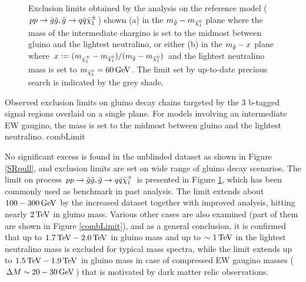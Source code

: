 \begin{figure}[h]
  \centering
    \caption{ Exclusion limits obtained by the analysis on the reference model ($pp \rightarrow \tilde{g}\tilde{g},  \tilde{g} \rightarrow q\bar{q} \tilde{\chi}_{1}^{\pm}$) shown 
  (a) in the $m_{\tilde{g}}-m_{\tilde{\chi}_{1}^{0}}$ plane where the mass of the intermediate chargino is set to the midmost between gluino and the lightest neutralino, or either 
  (b) in the $m_{\tilde{g}}-x$ plane where $x:= (m_{\tilde{\chi}_{1}^{\pm}}-m_{\tilde{\chi}_{1}^{0}})/(m_{\tilde{g}}-m_{\tilde{\chi}_{1}^{0}})$ and the lightest neutralino mass is set to $m_{\tilde{\chi}_{1}^{0}}=60\, \mathrm{GeV}$. 
  The limit set by up-to-date precious search \cite{2016ICHEP} is indicated by the grey shade.
  \label{limit_symQQC1} }
\end{figure}


{Observed exclusion limits on gluino decay chains targeted by the 3 b-tagged signal regions overlaid on a single plane. 
For models involving an intermediate EW gaugino, the mass is set to the midmost between gluino and the lightest neutralino.}
{combLimit}

No significant excess is found in the unblinded dataset as shown in Figure \ref{SRpull}, and exclusion limits are set on wide range of gluino decay scenarios. 
The limit on process $pp \rightarrow \tilde{g}\tilde{g},  \tilde{g} \rightarrow q\bar{q} \tilde{\chi}_{1}^{\pm}$ is presented in Figure \ref{limit_symQQC1}, which has been commonly used as benchmark in past analysis.
The limit extends about $100-300\, \mathrm{GeV}$ by the increased dataset together with improved analysis, hitting nearly $2\, \mathrm{TeV}$ in gluino mass. 
Various other cases are also examined (part of them are shown in Figure \ref{combLimit}), and as a general conclusion, 
it is confirmed that up to $1.7\, \mathrm{TeV} - 2.0 \, \mathrm{TeV}$ in gluino mass and up to $\sim 1\, \mathrm{TeV}$ in the lightest neutralino mass is excluded for typical mass spectra, 
while the limit extends up to $1.5\, \mathrm{TeV} - 1.9 \, \mathrm{TeV}$ in gluino mass in case of compressed EW gaugino masses ($\Delta M \sim 20-30\, \mathrm{GeV}$) that is motivated by dark matter relic observations.


